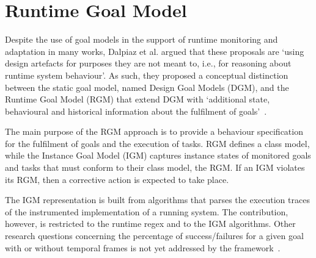 


\section{Runtime Goal Model}\label{sec:behaviour_specification}

Despite the use of goal models in the support of runtime monitoring and adaptation in many works, Dalpiaz et al. argued that these proposals are `using design artefacts for purposes they are not meant to, i.e., for reasoning about runtime system behaviour'. As such, they proposed a conceptual distinction between the static goal model, named Design Goal Models (DGM), and the Runtime Goal Model (RGM) that extend DGM with `additional state, behavioural and historical information about the fulfilment of goals'~\cite{Dalpiaz:2013}.

The main purpose of the RGM approach is to provide a behaviour specification for the fulfilment of goals and the execution of tasks. RGM defines a class model, while the Instance Goal Model (IGM) captures instance states of monitored goals and tasks that must conform to their class model, the RGM.  If an IGM violates its RGM, then a corrective action is expected to take place.

The IGM representation is built from algorithms that parses the execution traces of the instrumented implementation of a running system. The contribution, however, is restricted to the runtime regex and to the IGM algorithms. Other research questions concerning the percentage of success/failures for a given goal with or without temporal frames is not yet addressed by the framework~\cite{Dalpiaz:2013}.

